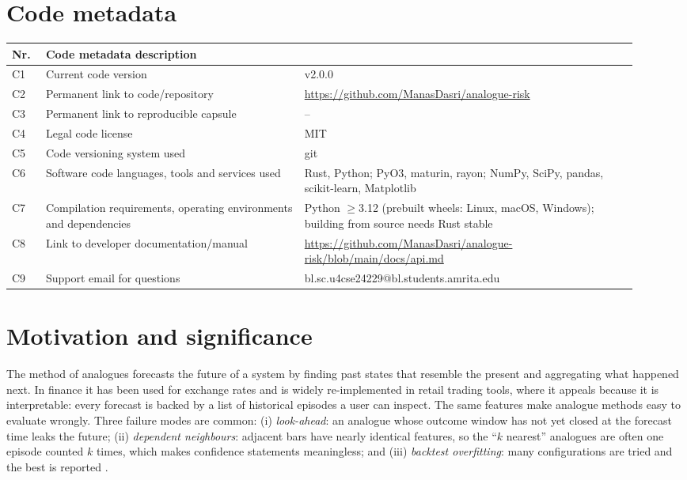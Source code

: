 \documentclass[preprint,12pt]{elsarticle}
\begin{document}
\section*{Code metadata}
\begin{table}[h]
\footnotesize
\begin{tabular}{p{0.05\linewidth}p{0.38\linewidth}p{0.49\linewidth}}
\toprule
Nr. & Code metadata description & \\
\midrule
C1 & Current code version & v2.0.0 \\
C2 & Permanent link to code/repository & \url{https://github.com/ManasDasri/analogue-risk} \\
C3 & Permanent link to reproducible capsule & -- \\
C4 & Legal code license & MIT \\
C5 & Code versioning system used & git \\
C6 & Software code languages, tools and services used & Rust, Python; PyO3, maturin, rayon; NumPy, SciPy, pandas, scikit-learn, Matplotlib \\
C7 & Compilation requirements, operating environments and dependencies & Python $\geq$3.12 (prebuilt wheels: Linux, macOS, Windows); building from source needs Rust stable \\
C8 & Link to developer documentation/manual & \url{https://github.com/ManasDasri/analogue-risk/blob/main/docs/api.md} \\
C9 & Support email for questions & bl.sc.u4cse24229@bl.students.amrita.edu \\
\bottomrule
\end{tabular}
\end{table}

\section{Motivation and significance}

The method of analogues \cite{lorenz1969,farmer1987} forecasts the future of a system by finding
past states that resemble the present and aggregating what happened next. In finance it has
been used for exchange rates \cite{fernandez1999} and is widely re-implemented in retail trading
tools, where it appeals because it is interpretable: every forecast is backed by a list of
historical episodes a user can inspect. The same features make analogue methods easy to evaluate
wrongly. Three failure modes are common:
(i) \emph{look-ahead}: an analogue whose outcome window has not yet closed at the forecast time
leaks the future;
(ii) \emph{dependent neighbours}: adjacent bars have nearly identical features, so the ``$k$
nearest'' analogues are often one episode counted $k$ times, which makes confidence statements
meaningless; and
(iii) \emph{backtest overfitting}: many configurations are tried and the best is reported
\cite{bailey2014,harvey2016}.
\end{document}
